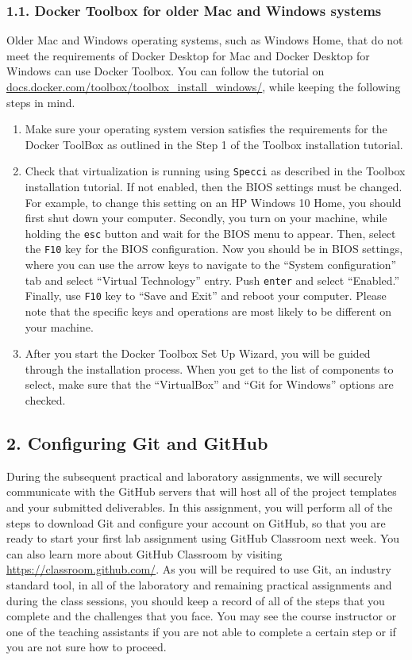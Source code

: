 	
\subsubsection*{1.1. Docker Toolbox for older Mac and Windows systems}
Older Mac and Windows operating systems, such as Windows Home, that do not meet the requirements of Docker Desktop for Mac and Docker Desktop for Windows can use Docker Toolbox. You can follow the tutorial on \url{docs.docker.com/toolbox/toolbox_install_windows/}, while keeping the following steps in mind.

\begin{enumerate}
	\item Make sure your operating system version satisfies the requirements for the Docker ToolBox as outlined in the Step 1 of the Toolbox installation tutorial.
	\item Check that virtualization is running using {\tt Specci} as described in the Toolbox installation tutorial. If not enabled, then the BIOS settings must be changed. For example, to change this setting on an HP Windows 10 Home, you should first shut down your computer. Secondly, you turn on your machine, while holding the {\tt esc} button and wait for the BIOS menu to appear. Then, select the {\tt F10} key for the BIOS configuration. Now you should be in BIOS settings, where you can use the arrow keys to navigate to the ``System configuration'' tab and select ``Virtual Technology'' entry. Push {\tt enter} and select ``Enabled.'' Finally, use {\tt F10} key to ``Save and Exit'' and reboot your computer. Please note that the specific keys and operations are most likely to be different on your machine.
	\item After you start the Docker Toolbox Set Up Wizard, you will be guided through the installation process. When you get to the list of components to select, make sure that the ``VirtualBox''  and ``Git for Windows'' options are checked.
	
\end{enumerate}


\subsection*{2. Configuring Git and GitHub}

During the subsequent practical and  laboratory assignments, we will securely communicate
with the GitHub servers that will host all of the project templates and your submitted deliverables. In this assignment,
you will perform all of the steps to download Git and configure your account on GitHub, so that you are ready to start your first lab assignment using
GitHub Classroom next week.  You can
also learn more about GitHub Classroom by visiting \url{https://classroom.github.com/}. As you will be required to use
Git, an industry standard tool, in all of the  laboratory and remaining practical assignments and during the class
sessions, you should keep a record of all of the steps that you complete and the challenges that you face. You may see
the course instructor or one of the teaching assistants if you are not able to complete a certain step or if you are not
sure how to proceed.

